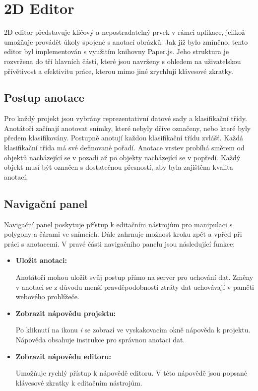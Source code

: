 \section{2D Editor}

2D editor představuje klíčový a nepostradatelný prvek v rámci aplikace, jelikož umožňuje provádět úkoly spojené s anotací obrázků. Jak již bylo zmíněno, tento editor byl implementován s využitím knihovny Paper.js. Jeho struktura je rozvržena do tří hlavních částí, které jsou navrženy s ohledem na uživatelskou přívětivost a efektivitu práce, kterou mimo jiné zrychlují klávesové zkratky.

\subsection{Postup anotace}
Pro každý projekt jsou vybrány reprezentativní datové sady a klasifikační třídy. Anotátoři začínají anotovat snímky, které nebyly dříve označeny, nebo které byly předem klasifikovány. Postupně anotují každou klasifikační třídu zvlášť. Každá klasifikační třída má své definované pořadí. Anotace vrstev probíhá směrem od objektů nacházející se v pozadí až po objekty nacházející se v popředí. Každý objekt musí být označen s dostatečnou přesností, aby byla zajištěna kvalita anotací.

\subsection{Navigační panel}
Navigační panel poskytuje přístup k editačním nástrojům pro manipulaci s polygony a čárami ve snímcích. Dále zahrnuje možnost kroku zpět a vpřed při práci s anotacemi. V pravé části navigačního panelu jsou následující funkce:

\begin{itemize}
    \item \textbf{Uložit anotaci:} 
    
    Anotátoři mohou uložit svůj postup přímo na server pro uchování dat. Změny v anotaci se z důvodu menší pravděpodobnosti ztráty dat uchovávají v paměti webového prohlížeče.  
    
    \item \textbf{Zobrazit nápovědu projektu:} 
    
    Po kliknutí na ikonu \textit{i} se zobrazí ve vyskakovacím okně nápověda k projektu. Nápověda obsahuje instrukce pro správnou anotaci dat. 

    \item \textbf{Zobrazit nápovědu editoru:} 
    
    Umožňuje rychlý přístup k nápovědě editoru. V této nápovědě jsou popsané klávesové zkratky k editačním nástrojům.
\end{itemize}

